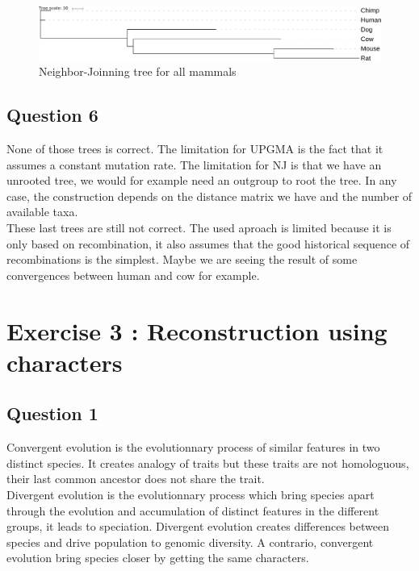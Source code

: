 \documentclass[]{article}
\theoremstyle{definition}
\begin{document}
\begin{figure}[h!]
	\includegraphics*[width = \linewidth]{../files/NJ.pdf}
	\caption{\label{nj2} Neighbor-Joinning tree for all mammals }
\end{figure}

\subsection{Question 6}

None of those trees is correct. The limitation for UPGMA is the fact that it assumes a constant mutation rate. The limitation for NJ is that we have an unrooted tree, we would for example need an outgroup to root the tree. In any case, the construction depends on the distance matrix we have and the number of available taxa.\\

These last trees are still not correct. The used aproach is limited because it is only based on recombination, it also assumes that the good historical sequence of recombinations is the simplest. Maybe we are seeing the result of some convergences between human and cow for example.


\section{Exercise 3 : Reconstruction using characters}
\subsection{Question 1}

Convergent evolution is the evolutionnary process of similar features in two distinct species. It creates analogy of traits but these traits are not homologuous, their last common ancestor does not share the trait.\\
Divergent evolution is the evolutionnary process which bring species apart through the evolution and accumulation of distinct features in the different groups, it leads to speciation.
Divergent evolution creates differences between species and drive population to genomic diversity.
A contrario, convergent evolution bring species closer by getting the same characters.
\end{document}
